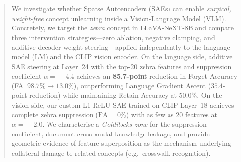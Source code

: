 \documentclass{article}
\begin{document}

\printAffiliationsAndNotice{}  %

\begin{abstract}
We investigate whether Sparse Autoencoders (SAEs) can enable
\emph{surgical, weight-free} concept unlearning inside a
Vision-Language Model (VLM). Concretely, we target the
\textit{zebra} concept in LLaVA-NeXT-8B and compare three
intervention strategies---zero ablation, negative clamping, and
additive decoder-weight steering---applied independently to the
language model (LM) and the CLIP vision encoder.
On the language side, additive SAE steering at Layer~24 with the
top-20 zebra features and suppression coefficient $\alpha\!=\!-4.4$
achieves an \textbf{85.7-point} reduction in Forget Accuracy
(FA: $98.7\%\!\to\!13.0\%$), outperforming Language Gradient Ascent
($35.4$-point reduction) while maintaining Retain Accuracy at $50.0\%$.
On the vision side, our custom L1-ReLU SAE trained on CLIP Layer~18
achieves complete zebra suppression ($\mathrm{FA}=0\%$) with as few as
20 features at $\alpha\!=\!-2.0$.
We characterise a \emph{Goldilocks zone} for the suppression
coefficient, document cross-modal knowledge leakage, and provide
geometric evidence of feature superposition as the mechanism
underlying collateral damage to related concepts (e.g.\ crosswalk
recognition).
\end{abstract}
\end{document}
